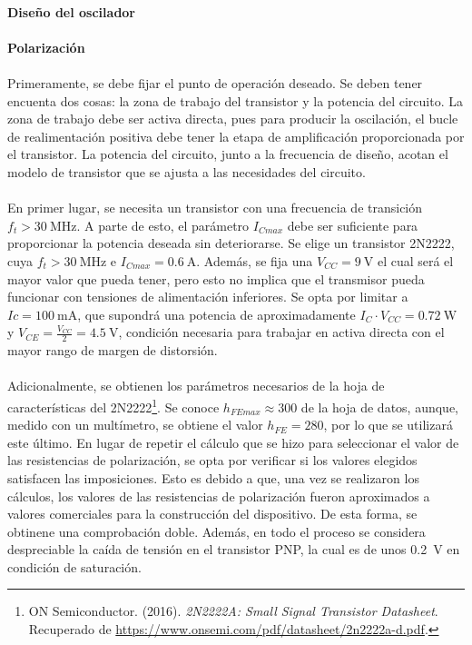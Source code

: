 \paragraph{Diseño del oscilador}
\paragraph{Polarizaci\'on} %
\paragraph{}
Primeramente, se debe fijar el punto de operación deseado. Se deben tener encuenta dos cosas: la zona de trabajo del transistor y la potencia del circuito. La zona de trabajo debe ser activa directa, pues para producir la oscilación, el bucle de realimentación positiva debe tener la etapa de amplificación proporcionada por el transistor. La potencia del circuito, junto a la frecuencia de diseño, acotan el modelo de transistor que se ajusta a las necesidades del circuito.
\paragraph{}
En primer lugar, se necesita un transistor con una frecuencia de transición $f_t > \SI{30}{\mega\hertz}$. 
A parte de esto, el parámetro $I_{Cmax}$ debe ser suficiente para proporcionar la potencia deseada sin deteriorarse. Se elige un transistor 2N2222, cuya $f_t > \SI{30}{\mega\hertz}$ e $I_{Cmax} = \SI{0.6}{\ampere}$. Adem\'as, se fija una $V_{CC} = \SI{9}{\volt}$ el cual ser\'a el mayor valor que pueda tener, pero esto no implica que el transmisor pueda funcionar con tensiones de alimentaci\'on inferiores. Se opta por limitar a $Ic = \SI{100}{\milli\ampere}$, que supondr\'a una potencia de aproximadamente $I_C \cdot V_{CC} = \SI{0.72}{\watt}$ y $V_{CE} = \frac{V_{CC}}{2} = \SI{4.5}{\volt}$, condici\'on necesaria para trabajar en activa directa con el mayor rango de margen de distorsi\'on. 
\paragraph{}
Adicionalmente, se obtienen los par\'ametros necesarios de la hoja de características del 2N2222\footnote{ON Semiconductor. (2016). \textit{2N2222A: Small Signal Transistor Datasheet}. Recuperado de \url{https://www.onsemi.com/pdf/datasheet/2n2222a-d.pdf}.}.
Se conoce $h_{FEmax} \approx 300$ de la hoja de datos, aunque, medido con un mult\'imetro, se obtiene el valor $h_{FE} = 280$, por lo que se utilizar\'a este \'ultimo.
En lugar de repetir el cálculo que se hizo para seleccionar el valor de las resistencias de polarización, se opta por verificar si los valores elegidos satisfacen las imposiciones. Esto es debido a que, una vez se realizaron los c\'alculos, los valores de las resistencias de polarizaci\'on fueron aproximados a valores comerciales para la construcci\'on del dispositivo. De esta forma, se obtinene una comprobaci\'on doble. Adem\'as, en todo el proceso se considera despreciable la ca\'ida de tensi\'on en el transistor PNP, la cual es de unos \SI{.2}{\volt} en condici\'on de saturaci\'on.
